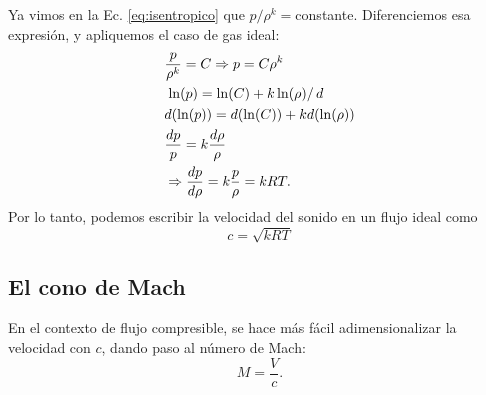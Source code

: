 Ya vimos en la Ec. \eqref{eq:isentropico} que $p/\rho^k=$constante.
Diferenciemos esa expresión, y apliquemos el caso de gas ideal:
%
\begin{align}
&\frac{p}{\rho^k}=C\Rightarrow p = C\rho^k\nonumber\\
&\left.\ln(p) = \ln(C)+k\ln(\rho)\right/d\nonumber\\
&d(\ln(p)) =d(\ln(C)) + kd(\ln(\rho))\nonumber\\
&\frac{dp}{p} = k\frac{d\rho}{\rho}\nonumber\\
&\Rightarrow \frac{dp}{d\rho} = k\frac{p}{\rho} = kRT.
\end{align}
%
Por lo tanto, podemos escribir la velocidad del sonido en un flujo ideal como 
%
\begin{equation}
c=\sqrt{kRT}
\end{equation}
\subsection*{El cono de Mach}

En el contexto de flujo compresible, se hace más fácil adimensionalizar la velocidad con $c$, dando paso al número de Mach:
%
\begin{equation}
M = \frac{V}{c}.
\end{equation}


